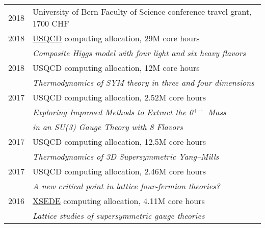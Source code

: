 \documentclass[10 pt]{article}
\begin{document}
\vspace{-12 pt} %
\begin{tabular}[t]{cl}
  2018 & University of Bern Faculty of Science conference travel grant, 1700 CHF                                                \\[6 pt]
  2018 & \href{http://www.usqcd.org}{USQCD} computing allocation, 29M core hours                                                \\ %
       & \textit{Composite Higgs model with four light and six heavy flavors}                                                   \\[6 pt]
  2018 & USQCD computing allocation, 12M core hours                                                                             \\ %
       & \textit{Thermodynamics of SYM theory in three and four dimensions}                                                     \\[6 pt]
  2017 & USQCD computing allocation, 2.52M core hours                                                                           \\ %
       & \textit{Exploring Improved Methods to Extract the 0$^{++}$ Mass} \\ & \textit{in an SU(3) Gauge Theory with 8 Flavors} \\[6 pt]
  2017 & USQCD computing allocation, 12.5M core hours                                                                           \\ %
       & \textit{Thermodynamics of 3D Supersymmetric Yang--Mills}                                                               \\[6 pt]
  2017 & USQCD computing allocation, 2.46M core hours                                                                           \\ %
       & \textit{A new critical point in lattice four-fermion theories?}                                                        \\[6 pt]
  2016 & \href{http://www.xsede.org}{XSEDE} computing allocation, 4.11M core hours                                              \\ %
       & \textit{Lattice studies of supersymmetric gauge theories}                                                              \\
\end{tabular}
\end{document}
